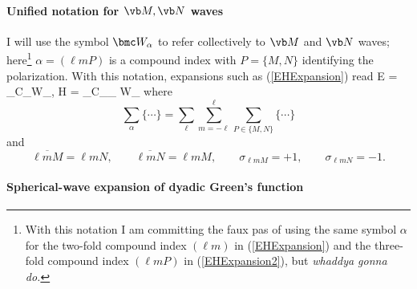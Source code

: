 \documentclass[letterpaper]{article}
\begin{document}
\paragraph{Unified notation for $\vb M, \vb N$ waves}

I will use the symbol $\bmc W_\alpha$ to refer
collectively to $\vb M$ and $\vb N$ waves;
here\footnote{With this notation I am committing the
faux pas of using the same symbol $\alpha$ for
the two-fold compound index $(\ell m)$ in (\ref{EHExpansion})
and the three-fold compound index $(\ell m P)$ in
(\ref{EHExpansion2}), but \textit{whaddya gonna do.}}
$\alpha=(\ell m P)$ is a compound index
with $P=\{M,N\}$ identifying the polarization.
With this notation, expansions such as (\ref{EHExpansion})
read
{\vb E = \sum_\alpha C_\alpha \bmc W_\alpha, \qquad
   \vb H = 
   \sum_\alpha C_\alpha \sigma_{\alpha} \bmc W_{\overline{\alpha}}
}
where 
$$ \sum_\alpha\{\cdots\} 
   = 
   \sum_{\ell}\sum_{m=-\ell}^\ell \sum_{P\in \{M,N\}} \{\cdots\}
$$
and 
$$
   \overline{\ell m M} = \ell m N, \qquad
   \overline{\ell m N} = \ell m M, \qquad
   \sigma_{\ell m M}=+1, \qquad
   \sigma_{\ell m N}=-1.
$$
\paragraph{Spherical-wave expansion of dyadic Green's function}
\end{document}
